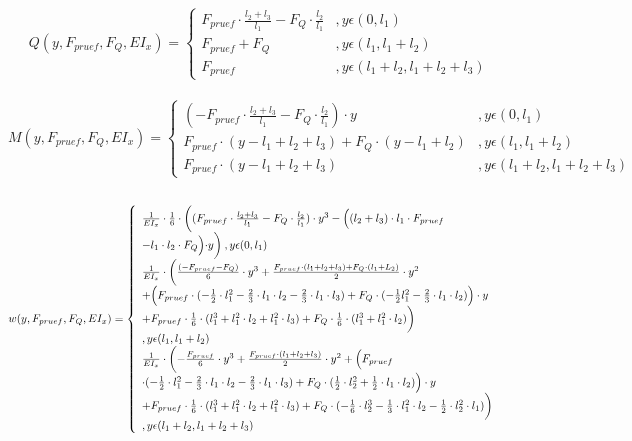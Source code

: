 \begin{equation}\label{eq:34}
	Q(y,F_{pruef},F_{Q},EI_{x})=\left\{\begin{array}{ll}
		F_{pruef}\cdot \frac{l_{2}+l_{3}}{l_{1}}-F_{Q}\cdot \frac{l_{2}}{l_{1}}&,y\epsilon (0,l_{1})\\
		F_{pruef}+F_{Q}&,y\epsilon (l_{1}, l_{1}+l_{2})\\
		F_{pruef}&,y\epsilon (l_{1}+l_{2}, l_{1}+l_{2}+l_{3})
	\end{array}\right.
\end{equation}\\
\begin{equation}\label{eq:35}
	M(y,F_{pruef},F_{Q},EI_{x})=\left\{\begin{array}{ll}
		(-F_{pruef}\cdot \frac{l_{2}+l_{3}}{l_{1}}-F_{Q}\cdot \frac{l_{2}}{l_{1}})\cdot y&,y\epsilon (0,l_{1})\\
		F_{pruef}\cdot (y-l_{1}+l_{2}+l_{3})+F_{Q}\cdot (y-l_{1}+l_{2})&,y\epsilon (l_{1}, l_{1}+l_{2})\\
		F_{pruef}\cdot (y-l_{1}+l_{2}+l_{3})&,y\epsilon (l_{1}+l_{2}, l_{1}+l_{2}+l_{3})
	\end{array}\right.
\end{equation}\\
\begin{equation}\label{eq:36}
	w(y,F_{pruef},F_{Q},EI_{x})=\left\{\begin{array}{ll}
		\frac{1}{EI_{x}}\cdot\frac{1}{6}\cdot\biggl((F_{pruef}\cdot \frac{l_{2}+l_{3}}{l_{1}}-F_{Q}\cdot \frac{l_{2}}{l_{1}})\cdot y^{3}-\Bigl((l_{2}+l_{3})\cdot l_{1}\cdot F_{pruef}\\-l_{1}\cdot l_{2}\cdot F_{Q}\Bigl)\cdot y \biggr)\:,y\epsilon (0,l_{1})&\\
		\frac{1}{EI_{x}}\cdot\biggl(\frac{(-F_{pruef}-F_{Q})}{6}\cdot y^{3} + \frac{F_{pruef}\cdot (l_{1}+l_{2}+l_{3})+F_{Q}\cdot (l_{1}+L_{2})}{2}\cdot y^{2}\\ + \Bigl(F_{pruef}\cdot(-\frac{1}{2}\cdot l_{1}^{2}-\frac{2}{3}\cdot l_{1}\cdot l_{2}-\frac{2}{3}\cdot l_{1}\cdot l_{3})+ F_{Q}\cdot(-\frac{1}{2}l_{1}^{2}-\frac{2}{3}\cdot l_{1}\cdot l_{2})\Bigr)\cdot y \\+ F_{pruef}\cdot\frac{1}{6}\cdot(l_{1}^{3}+l_{1}^{2}\cdot l_{2}+l_{1}^{2}\cdot l_{3}) + F_{Q}\cdot\frac{1}{6}\cdot(l_{1}^{3}+l_{1}^{2}\cdot l_{2})\biggr)&\\,y\epsilon (l_{1}, l_{1}+l_{2})\\
		\frac{1}{EI_{x}}\cdot\biggl(-\frac{F_{pruef}}{6}\cdot y^{3} + \frac{ F_{pruef}\cdot (l_{1}+l_{2}+l_{3})}{2}\cdot y^{2} + \Bigl(F_{pruef} \\
		\cdot(-\frac{1}{2}\cdot l_{1}^{2} -\frac{2}{3}\cdot l_{1}\cdot l_{2}-\frac{2}{3}\cdot l_{1}\cdot l_{3}) + F_{Q}\cdot(\frac{1}{2}\cdot l_{2}^{2}+\frac{1}{2}\cdot l_{1}\cdot l_{2})\Bigr)\cdot y \\ +F_{pruef}\cdot\frac{1}{6}\cdot(l_{1}^{3}+l_{1}^{2}\cdot l_{2}+l_{1}^{2}\cdot l_{3}) + F_{Q}\cdot(-\frac{1}{6}\cdot l_{2}^{3}-\frac{1}{3}\cdot l_{1}^{2}\cdot l_{2}-\frac{1}{2}\cdot l_{2}^{2}\cdot l_{1})\biggr)&\\,y\epsilon (l_{1}+l_{2}, l_{1}+l_{2}+l_{3})
	\end{array}\right.
\end{equation}\\
